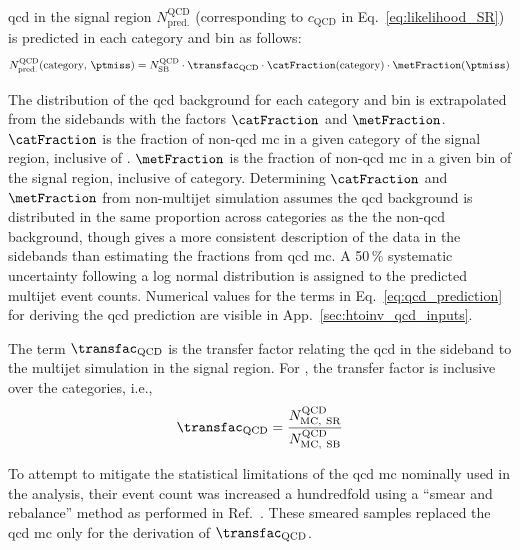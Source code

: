 \acrshort{qcd} in the signal region $N_{\mathrm{pred.}}^{\mathrm{QCD}}$ (corresponding to $c_{\mathrm{QCD}}$ in Eq.~\ref{eq:likelihood_SR}) is predicted in each category and \ptmiss bin as follows:
\begin{equation}
    N_{\mathrm{pred.}}^{\mathrm{QCD}}(\text{category}, \, \ptmiss) = N_{\mathrm{SB}}^{\mathrm{QCD}} \cdot \transfac_{\mathrm{QCD}} \cdot \catFraction(\text{category}) \cdot \metFraction(\ptmiss)
    \label{eq:qcd_prediction}
\end{equation}

The distribution of the \acrshort{qcd} background for each category and \ptmiss bin is extrapolated from the sidebands with the factors $\catFraction$ and $\metFraction$. $\catFraction$ is the fraction of non-\acrshort{qcd} \acrshort{mc} in a given category of the signal region, inclusive of \ptmiss. $\metFraction$ is the fraction of non-\acrshort{qcd} \acrshort{mc} in a given \ptmiss bin of the signal region, inclusive of category. Determining $\catFraction$ and $\metFraction$ from non-multijet simulation assumes the \acrshort{qcd} background is distributed in the same proportion across categories as the the non-\acrshort{qcd} background, though gives a more consistent description of the data in the sidebands than estimating the fractions from \acrshort{qcd} \acrshort{mc}. A 50\,\% systematic uncertainty following a log normal distribution is assigned to the predicted multijet event counts. Numerical values for the terms in Eq.~\ref{eq:qcd_prediction} for deriving the \acrshort{qcd} prediction are visible in App.~\ref{sec:htoinv_qcd_inputs}.

The term $\transfac_{\mathrm{QCD}}$ is the transfer factor relating the \acrshort{qcd} in the sideband to the multijet simulation in the signal region. For \ttH, the transfer factor is inclusive over the categories, i.e.,
\begin{equation}
    \transfac_{\mathrm{QCD}} = \frac{ N_{\mathrm{MC, \ SR}}^{\mathrm{QCD}} } { N_{\mathrm{MC, \ SB}}^{\mathrm{QCD}} }
    \label{eq:transfer_factor_qcd}
\end{equation}

To attempt to mitigate the statistical limitations of the \acrshort{qcd} \acrshort{mc} nominally used in the analysis, their event count was increased a hundredfold using a ``smear and rebalance'' method as performed in Ref.~. These smeared samples replaced the \acrshort{qcd} \acrshort{mc} only for the derivation of $\transfac_{\mathrm{QCD}}$.

